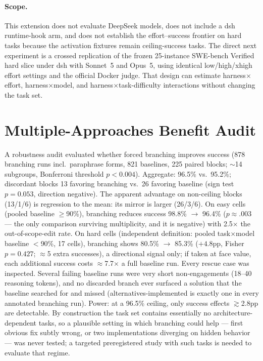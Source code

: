 \documentclass[11pt]{article}
\newcommand{\xd}{$\times$}
\begin{document}
\paragraph{Scope.} This extension does not evaluate DeepSeek models, does not
include a dsh runtime-hook arm, and does not establish the effort--success
frontier on hard tasks because the activation fixtures remain ceiling-success
tasks. The direct next experiment is a crossed replication of the frozen
25-instance SWE-bench Verified hard slice under dsh with Sonnet~5 and Opus~5,
using identical low/high/xhigh effort settings and the official Docker judge.
That design can estimate harness$\times$effort, harness$\times$model, and
harness$\times$task-difficulty interactions without changing the task set.

\section{Multiple-Approaches Benefit Audit}
\label{app:ma-audit}
A robustness audit evaluated whether forced branching improves success
(878 branching runs incl.\ paraphrase forms, 821 baselines, 225 paired
blocks; $\sim$14 subgroups, Bonferroni threshold $p<0.004$). Aggregate:
96.5\% vs.\ 95.2\%; discordant blocks 13 favoring branching vs.\ 26
favoring baseline (sign test $p=0.053$, direction negative). The apparent
advantage on non-ceiling blocks (13/1/6) is regression to the mean: its
mirror is larger (26/3/6). On easy cells (pooled baseline $\geq$90\%),
branching reduces success 98.8\% $\to$ 96.4\% ($p\approx.003$ --- the only
comparison surviving multiplicity, and it is negative) with 2.5\xd{} the
out-of-scope-edit rate. On hard cells (independent definition: pooled
task$\times$model baseline $<$90\%, 17 cells), branching shows
80.5\% $\to$ 85.3\% ($+4.8$pp, Fisher $p=0.427$; $\approx$5 extra
successes), a directional signal only; if taken at face value, each
additional success costs $\approx$7.7\xd{} a full baseline run. Every rescue case was inspected. Several failing baseline runs were very
short non-engagements
(18--40 reasoning tokens), and no discarded branch ever surfaced a
solution that the baseline searched for and missed
(alternatives-implemented is exactly one in every annotated branching
run). Power: at a 96.5\% ceiling, only success effects
$\gtrsim$2.8pp are detectable. By construction the task set contains
essentially no architecture-dependent tasks, so a plausible setting in which branching could help --- first obvious fix subtly wrong, or two
implementations diverging on hidden behavior --- was never tested; a targeted preregistered study with such tasks is needed to evaluate that
regime.
\end{document}
